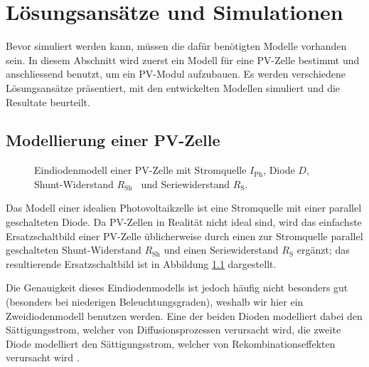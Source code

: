 \chapter{L\"osungsans\"atze und Simulationen}
\label{chap:simu}

Bevor  simuliert  werden  kann,  m\"ussen  die  daf\"ur  ben\"otigten  Modelle
vorhanden sein. In diesem Abschnitt wird zuerst ein Modell f\"ur eine PV-Zelle
bestimmt und  anschliessend benutzt,  um ein  PV-Modul aufzubauen.   Es werden
verschiedene L\"osungsans\"atze  pr\"asentiert, mit den  entwickelten Modellen
simuliert und die Resultate beurteilt.


\section{Modellierung einer PV-Zelle}
\label{sec:simu:model:cell}

\begin{figure}
    \centering
    
    \caption[Eindiodenmodell PV-Zelle]{%
        Eindiodenmodell  einer  PV-Zelle  mit  Stromquelle  $I_{\mathrm{Ph}}$,
        Diode  $D$,  Shunt-Widerstand $R_{\mathrm{Sh}}$~  und  Seriewiderstand
        $R_{\mathrm{S}}$.%
    }
    \label{fig:pvcell:1diode}
\end{figure}

Das Modell  einer idealien  Photovoltaikzelle ist  eine Stromquelle  mit einer
parallel geschalteten Diode. Da PV-Zellen in Realit\"at nicht ideal sind, wird
das einfachste Ersatzschaltbild einer PV-Zelle \"ublicherweise durch einen zur
Stromquelle parallel geschalteten Shunt-Widerstand $R_{\mathrm{Sh}}$ und einen
Seriewiderstand $R_{\mathrm{S}}$ erg\"anzt; das resultierende Ersatzschaltbild
ist in Abbildung \ref{fig:pvcell:1diode} dargestellt.

Die Genauigkeit  dieses Eindiodenmodells  ist jedoch h\"aufig  nicht besonders
gut  \cite{pvcell:phang}  \cite{pvcell:masmoudi}   (besonders  bei  niederigen
Beleuchtungsgraden),   weshalb   wir   hier  ein   Zweidiodenmodell   benutzen
werden. Eine  der  beiden  Dioden   modelliert  dabei  den  S\"attigungsstrom,
welcher von  Diffusionsprozessen verursacht wird, die  zweite Diode modelliert
den  S\"attigungsstrom,  welcher  von Rekombinationseffekten  verursacht  wird
\cite{pvcell:masmoudi}.


